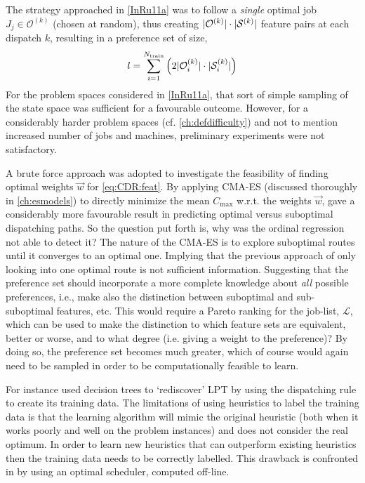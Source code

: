 The strategy approached in  \cref{InRu11a} was to follow a \emph{single} 
optimal job $J_j\in\mathcal{O}^{(k)}$ (chosen at random), thus creating 
$\lvert\mathcal{O}^{(k)}\rvert\cdot\lvert\mathcal{S}^{(k)}\rvert$ feature pairs at each 
dispatch $k$, resulting in a preference set of size,
\begin{equation}\label{eq:sizePsi_b}
l =  \sum_{i=1}^{N_{\text{train}}} \left(2 \abs{\mathcal{O}^{(k)}_i}\cdot 
\abs{\mathcal{S}^{(k)}_i} \right)
\end{equation}
For the problem spaces considered in \cref{InRu11a}, that sort of simple 
sampling of the state space was sufficient for a favourable outcome. 
However, for a considerably harder problem spaces (cf. \cref{ch:defdifficulty}) 
and not to mention increased number of jobs and machines, preliminary 
experiments were not satisfactory. 

A brute force approach was adopted to investigate the feasibility of finding 
optimal weights $\vec{w}$ for \cref{eq:CDR:feat}. 
By applying CMA-ES (discussed thoroughly in \cref{ch:esmodels}) to directly 
minimize the mean $C_{\max}$  w.r.t. the weights $\vec{w}$, gave a considerably 
more favourable result in predicting optimal versus suboptimal dispatching 
paths. 
So the question put forth is, why was the ordinal regression not able to detect 
it?
The nature of the CMA-ES is to explore suboptimal routes until it converges to 
an optimal one. 
Implying that the previous approach of only looking into one optimal route is 
not sufficient information. 
Suggesting that the preference set should incorporate a more complete knowledge 
about \emph{all} possible preferences, i.e., make also the distinction between 
suboptimal and sub-suboptimal features, etc.  
This would require a Pareto ranking for the job-list, $\mathcal{L}$, which can 
be used to make the distinction to which feature sets are equivalent, better or 
worse, and to what degree (i.e. giving a weight to the preference)? 
By doing so, the preference set becomes much greater, which of course would 
again need to be sampled in order to be computationally feasible to learn. 

For instance \cite{Siggi05} used decision trees to `rediscover' LPT by using 
the dispatching rule to create its training data. The limitations of using 
heuristics to label the training data is that the learning algorithm will mimic 
the original heuristic (both when it works poorly and well on the problem 
instances) and does not consider the real optimum. In order to learn new 
heuristics that can outperform existing heuristics then the training data needs 
to be correctly labelled. This drawback is confronted in 
\citep{Malik08,Russell09,Siggi10} by using an optimal scheduler, computed 
off-line. 


